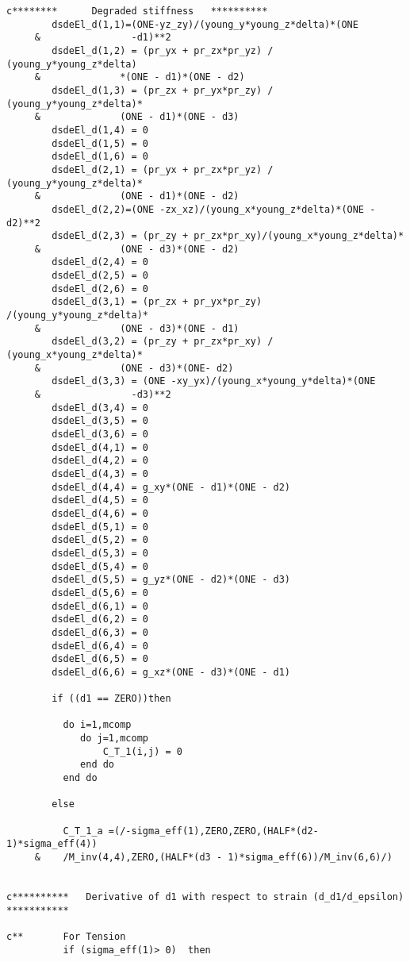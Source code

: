 \begin{lstlisting}
c********      Degraded stiffness   **********      
        dsdeEl_d(1,1)=(ONE-yz_zy)/(young_y*young_z*delta)*(ONE
     &                -d1)**2
        dsdeEl_d(1,2) = (pr_yx + pr_zx*pr_yz) / (young_y*young_z*delta)
     &              *(ONE - d1)*(ONE - d2)
        dsdeEl_d(1,3) = (pr_zx + pr_yx*pr_zy) / (young_y*young_z*delta)*
     &              (ONE - d1)*(ONE - d3)
        dsdeEl_d(1,4) = 0
        dsdeEl_d(1,5) = 0
        dsdeEl_d(1,6) = 0
        dsdeEl_d(2,1) = (pr_yx + pr_zx*pr_yz) / (young_y*young_z*delta)*
     &              (ONE - d1)*(ONE - d2)
        dsdeEl_d(2,2)=(ONE -zx_xz)/(young_x*young_z*delta)*(ONE - d2)**2
        dsdeEl_d(2,3) = (pr_zy + pr_zx*pr_xy)/(young_x*young_z*delta)*
     &              (ONE - d3)*(ONE - d2)
        dsdeEl_d(2,4) = 0
        dsdeEl_d(2,5) = 0
        dsdeEl_d(2,6) = 0
        dsdeEl_d(3,1) = (pr_zx + pr_yx*pr_zy) /(young_y*young_z*delta)*
     &              (ONE - d3)*(ONE - d1)
        dsdeEl_d(3,2) = (pr_zy + pr_zx*pr_xy) / (young_x*young_z*delta)*
     &              (ONE - d3)*(ONE- d2)
        dsdeEl_d(3,3) = (ONE -xy_yx)/(young_x*young_y*delta)*(ONE
     &                -d3)**2
        dsdeEl_d(3,4) = 0
        dsdeEl_d(3,5) = 0
        dsdeEl_d(3,6) = 0
        dsdeEl_d(4,1) = 0
        dsdeEl_d(4,2) = 0 
        dsdeEl_d(4,3) = 0
        dsdeEl_d(4,4) = g_xy*(ONE - d1)*(ONE - d2)
        dsdeEl_d(4,5) = 0
        dsdeEl_d(4,6) = 0
        dsdeEl_d(5,1) = 0
        dsdeEl_d(5,2) = 0 
        dsdeEl_d(5,3) = 0
        dsdeEl_d(5,4) = 0
        dsdeEl_d(5,5) = g_yz*(ONE - d2)*(ONE - d3)
        dsdeEl_d(5,6) = 0
        dsdeEl_d(6,1) = 0
        dsdeEl_d(6,2) = 0 
        dsdeEl_d(6,3) = 0
        dsdeEl_d(6,4) = 0
        dsdeEl_d(6,5) = 0
        dsdeEl_d(6,6) = g_xz*(ONE - d3)*(ONE - d1)
        
        if ((d1 == ZERO))then
          
          do i=1,mcomp
             do j=1,mcomp
                 C_T_1(i,j) = 0        
             end do
          end do  
          
        else
            
          C_T_1_a =(/-sigma_eff(1),ZERO,ZERO,(HALF*(d2- 1)*sigma_eff(4))
     &    /M_inv(4,4),ZERO,(HALF*(d3 - 1)*sigma_eff(6))/M_inv(6,6)/) 
 
          
c**********   Derivative of d1 with respect to strain (d_d1/d_epsilon)   ***********
 
c**       For Tension          
          if (sigma_eff(1)> 0)  then
              

\end{lstlisting}
